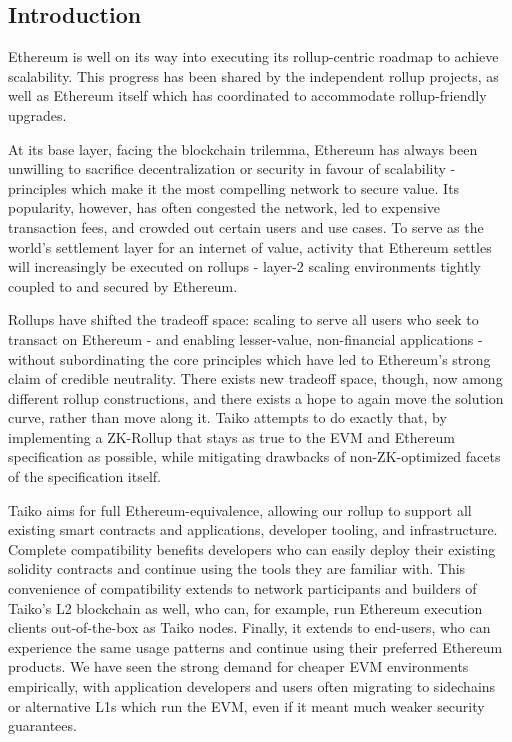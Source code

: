 \documentclass[9pt,oneside]{amsart}
\begin{document}
\setlength{\columnsep}{20pt}
\begin{multicols}{2}


\section{Introduction}
Ethereum is well on its way into executing its rollup-centric roadmap to achieve scalability. This progress has been shared by the independent rollup projects, as well as Ethereum itself which has coordinated to accommodate rollup-friendly upgrades. 

At its base layer, facing the blockchain trilemma, Ethereum has always been unwilling to sacrifice decentralization or security in favour of scalability - principles which make it the most compelling network to secure value. Its popularity, however, has often congested the network, led to expensive transaction fees, and crowded out certain users and use cases. To serve as the world's settlement layer for an internet of value, activity that Ethereum settles will increasingly be executed on rollups - layer-2 scaling environments tightly coupled to and secured by Ethereum.

Rollups have shifted the tradeoff space: scaling to serve all users who seek to transact on Ethereum - and enabling lesser-value, non-financial applications - without subordinating the core principles which have led to Ethereum's strong claim of credible neutrality. There exists new tradeoff space, though, now among different rollup constructions, and there exists a hope to again move the solution curve, rather than move along it. Taiko attempts to do exactly that, by implementing a ZK-Rollup that stays as true to the EVM and Ethereum specification as possible, while mitigating drawbacks of non-ZK-optimized facets of the specification itself.

Taiko aims for full Ethereum-equivalence, allowing our rollup to support all existing smart contracts and applications, developer tooling, and infrastructure. Complete compatibility benefits developers who can easily deploy their existing solidity contracts and continue using the tools they are familiar with. This convenience of compatibility extends to network participants and builders of Taiko's L2 blockchain as well, who can, for example, run Ethereum execution clients out-of-the-box as Taiko nodes. Finally, it extends to end-users, who can experience the same usage patterns and continue using their preferred Ethereum products. We have seen the strong demand for cheaper EVM environments empirically, with application developers and users often migrating to sidechains or alternative L1s which run the EVM, even if it meant much weaker security guarantees.


\end{multicols}
\end{document}

